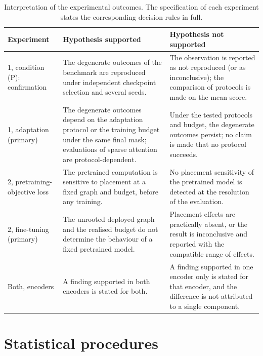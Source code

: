 \documentclass[10pt]{article}
\begin{document}
\begin{table}[H]
\centering
\caption{Interpretation of the experimental outcomes. The specification of each experiment states the corresponding decision rules in full.}
\label{tab:decision}
\scriptsize
\begin{tabular}{p{2.6cm}p{5.5cm}p{5.5cm}}
\toprule
Experiment & Hypothesis supported & Hypothesis not supported \\
\midrule
1, condition (P): confirmation & The degenerate outcomes of the benchmark are reproduced under independent checkpoint selection and several seeds. & The observation is reported as not reproduced (or as inconclusive); the comparison of protocols is made on the mean score. \\
1, adaptation (primary) & The degenerate outcomes depend on the adaptation protocol or the training budget under the same final mask; evaluations of sparse attention are protocol-dependent. & Under the tested protocols and budget, the degenerate outcomes persist; no claim is made that no protocol succeeds. \\
2, pretraining-objective loss & The pretrained computation is sensitive to placement at a fixed graph and budget, before any training. & No placement sensitivity of the pretrained model is detected at the resolution of the evaluation. \\
2, fine-tuning (primary) & The unrooted deployed graph and the realised budget do not determine the behaviour of a fixed pretrained model. & Placement effects are practically absent, or the result is inconclusive and reported with the compatible range of effects. \\
Both, encoders & A finding supported in both encoders is stated for both. & A finding supported in one encoder only is stated for that encoder, and the difference is not attributed to a single component. \\
\bottomrule
\end{tabular}
\end{table}

\section{Statistical procedures}
\label{app:stats}
\end{document}
